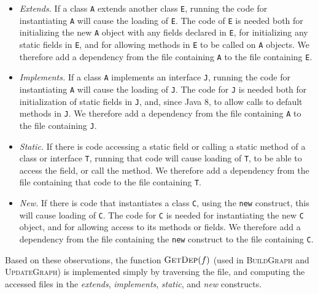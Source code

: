 {\begin{itemize}
  \item \emph{Extends.}\hspace{0.2cm} If a class \texttt{A} extends another
    class \texttt{E}, running the code for instantiating \texttt{A} will cause
    the loading of \texttt{E}. The code of \texttt{E} is needed both for
    initializing the new \texttt{A} object with any fields declared in \texttt{E}, for
    initializing any static fields in \texttt{E}, and for allowing methods in \texttt{E} to be
    called on \texttt{A} objects. We therefore add a dependency from the file containing
    \texttt{A} to the file containing \texttt{E}.
  \item \emph{Implements.}\hspace{0.2cm} If a class \texttt{A} implements an interface \texttt{J}, running the code for instantiating \texttt{A} will cause the loading of \texttt{J}. The code for \texttt{J} is needed both for initialization of static fields in \texttt{J}, and, since Java 8, to allow calls to default methods in \texttt{J}. We therefore add a dependency from the file containing \texttt{A} to the file containing \texttt{J}. 
  \item \emph{Static.}\hspace{0.2cm} If there is code accessing a static field or calling a static method of a class or interface \texttt{T}, running that code will cause loading of \texttt{T}, to be able to access the field, or call the method. We therefore add a dependency from the file containing that code to the file containing \texttt{T}.
  \item \emph{New.}\hspace{0.2cm} If there is code that instantiates a class \texttt{C}, using the
    \texttt{new} construct, this will cause loading of \texttt{C}. The code for \texttt{C} is needed for instantiating the new \texttt{C} object, and for allowing access to its methods or fields. We therefore add a dependency from the file containing the \texttt{new} construct to the file containing \texttt{C}.
\end{itemize}

Based on these observations, the function $\textsc{GetDep}(f)$ (used in \textsc{BuildGraph} and \textsc{UpdateGraph}) is implemented simply by traversing the file, and computing the accessed files in the \emph{extends}, \emph{implements}, \emph{static}, and \emph{new} constructs. 

}
